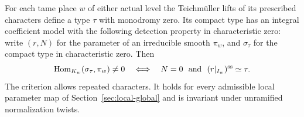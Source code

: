 \begin{proposition}
\label{prop:ordinary-zero-monodromy-type}
For each tame place \(w\) of either actual level the Teichmüller
lifts of its prescribed characters define a type \(\tau\) with
monodromy zero. Its compact type has an integral coefficient
model with the following detection property in characteristic zero:
write \((r,N)\) for the parameter of an irreducible smooth \(\pi_w\),
and \(\sigma_\tau\) for the compact type in characteristic zero. Then
\[
 \operatorname{Hom}_{K_w}(\sigma_\tau,\pi_w)\ne0
       \quad\Longleftrightarrow\quad N=0\ \text{ and }\
                                  (r|_{I_w})^{\rm ss}\simeq\tau .
\]
The criterion allows repeated characters. It holds for every
admissible local parameter map of Section~\ref{sec:local-global}
and is invariant under unramified normalization twists.
\end{proposition}

